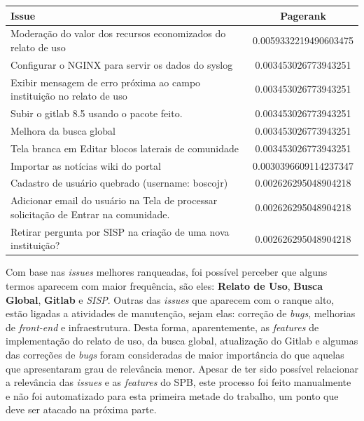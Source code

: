 \begin{table}[h]
        \centering
	\label{tab:pagerank}
	
        \begin{tabular}{| >{\centering}m{10cm} | c |}
        	\toprule
		\textbf{Issue} & \textbf{Pagerank} \\
		\midrule
		Moderação do valor dos recursos economizados do relato de uso & 0.0059332219490603475 \\ \hline
                Configurar o NGINX para servir os dados do syslog & 0.003453026773943251 \\ \hline
                Exibir mensagem de erro próxima ao campo instituição no relato de uso &  0.003453026773943251 \\\hline
                Subir o gitlab 8.5 usando o pacote feito. & 0.003453026773943251 \\\hline
                Melhora da busca global & 0.003453026773943251 \\\hline
                Tela branca em Editar blocos laterais de comunidade & 0.003453026773943251 \\\hline
                Importar as notícias wiki do portal &  0.0030396609114237347 \\\hline
                Cadastro de usuário quebrado (username: boscojr) & 0.002626295048904218 \\\hline
                Adicionar email do usuário na Tela de processar solicitação de Entrar na comunidade. & 0.002626295048904218 \\\hline
                Retirar pergunta por SISP na criação de uma nova instituição? & 0.002626295048904218 \\\hline
		\bottomrule      
 	\end{tabular}
\end{table}

Com base nas \textit{issues} melhores ranqueadas, foi possível perceber que alguns termos aparecem com maior frequência, são eles: \textbf{Relato de Uso}, \textbf{Busca Global}, \textbf{Gitlab} e \textit{SISP}. Outras das \textit{issues} que aparecem com o ranque alto, estão ligadas a atividades de manutenção, sejam elas: correção de \textit{bugs}, melhorias de \textit{front-end} e infraestrutura. Desta forma, aparentemente, as \textit{features} de implementação do relato de uso, da busca global, atualização do Gitlab e algumas das correções de \textit{bugs} foram consideradas de maior importância do que aquelas que apresentaram grau de relevância menor. Apesar de ter sido possível relacionar a relevância das \textit{issues} e as \textit{features} do SPB, este processo foi feito manualmente e não foi automatizado para esta primeira metade do trabalho, um ponto que deve ser atacado na próxima parte.
